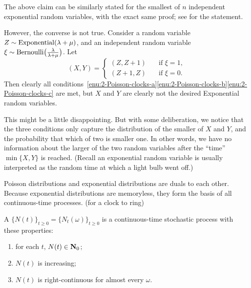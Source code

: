\documentclass[10pt]{book}
\begin{document}


The above claim can be similarly stated for the smallest of $n$ independent exponential random variables, with the exact same proof; see \cite[Exercise~3.7.3]{Durrett_2019} for the statement.

However, the converse is not true. Consider a random variable $Z \sim \operatorname{Exponential}(\lambda + \mu)$, and an independent random variable $\xi \sim \operatorname{Bernoulli}\bigl(\frac{\lambda}{\lambda + \mu}\bigr)$. Let \[
    (X,Y) = \begin{cases}
        (Z,Z+1) & \text{if } \xi = 1,\\
        (Z+1,Z)\quad & \text{if }\xi =0.
    \end{cases}
\]
Then clearly all conditions~\ref{enu:2-Poisson-clocks-a}\ref{enu:2-Poisson-clocks-b}\ref{enu:2-Poisson-clocks-c} are met, but $X$ and $Y$ are clearly not the desired Exponential random variables.

This might be a little disappointing. But with some deliberation, we notice that the three conditions only capture the distribution of the smaller of $X$ and $Y$, and the probability that which of two is smaller one. In other words, we have no information about the larger of the two random variables after the ``time'' $\min\{X,Y\}$ is reached. (Recall an exponential random variable is usually interpreted as the random time at which a light bulb went off.)

Poisson distributions and exponential distributions are duals to each other. Because exponential distributions are memoryless, they form the basis of all continuous-time processes. (for a clock to ring)

A  $\{N(t)\}_{t\geq 0} = \{N_t(\omega)\}_{t\geq 0}$ is a continuous-time stochastic process with these properties:  
\begin{enumerate}[label=(\roman*)]
\item for each $t$, $N(t) \in \mathbf{N}_0$;
\item $N(t)$ is increasing;
\item \label{enu:count-proc}$N(t)$ is right-continuous for almost every $\omega$.
\end{enumerate}
\end{document}
